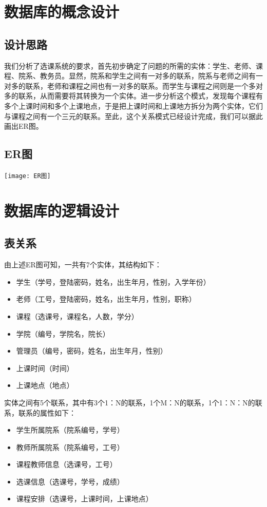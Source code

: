\documentclass[a4paper, 11pt, nofonts, nocap, fancyhdr]{ctexart}
\begin{document}
\newpage
\section{数据库的概念设计}

\subsection{设计思路}
我们分析了选课系统的要求，首先初步确定了问题的所需的实体：学生、老师、课程、院系、教务员。显然，院系和学生之间有一对多的联系，院系与老师之间有一对多的联系，老师和课程之间也有一对多的联系。而学生与课程之间则是一个多对多的联系，从而需要将其转换为一个实体。进一步分析这个模式，发现每个课程有多个上课时间和多个上课地点，于是把上课时间和上课地方拆分为两个实体，它们与课程之间有一个三元的联系。至此，这个关系模式已经设计完成，我们可以据此画出ER图。

\subsection{ER图}
	\texttt{[image: ER图]}

\section{数据库的逻辑设计}

\subsection{表关系}
由上述ER图可知，一共有7个实体，其结构如下：
\begin{itemize}
    \item 学生（学号，登陆密码，姓名，出生年月，性别，入学年份）
    \item 老师（工号，登陆密码，姓名，出生年月，性别，职称）
    \item 课程（选课号，课程名，人数，学分）
    \item 学院（编号，学院名，院长）
    \item 管理员（编号，密码，姓名，出生年月，性别）
    \item 上课时间（时间）
    \item 上课地点（地点）
\end{itemize}

实体之间有5个联系，其中有3个1：N的联系，1个M：N的联系，1个1：N：N的联系，联系的属性如下：
\begin{itemize}
    \item 学生所属院系（院系编号，学号）
    \item 教师所属院系（院系编号，工号）
    \item 课程教师信息（选课号，工号）
    \item 选课信息（选课号，学号，成绩）
    \item 课程安排（选课号，上课时间，上课地点）
\end{itemize}
\end{document}
